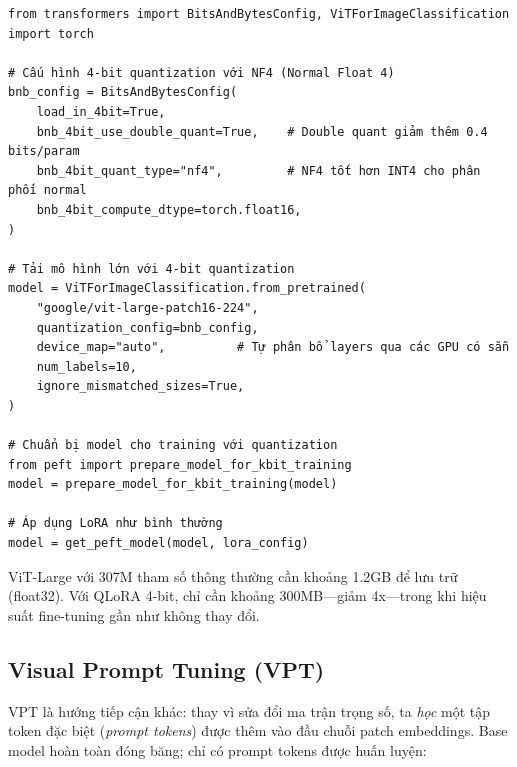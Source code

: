\begin{verbatim}
from transformers import BitsAndBytesConfig, ViTForImageClassification
import torch

# Cấu hình 4-bit quantization với NF4 (Normal Float 4)
bnb_config = BitsAndBytesConfig(
    load_in_4bit=True,
    bnb_4bit_use_double_quant=True,    # Double quant giảm thêm 0.4 bits/param
    bnb_4bit_quant_type="nf4",         # NF4 tốt hơn INT4 cho phân phối normal
    bnb_4bit_compute_dtype=torch.float16,
)

# Tải mô hình lớn với 4-bit quantization
model = ViTForImageClassification.from_pretrained(
    "google/vit-large-patch16-224",
    quantization_config=bnb_config,
    device_map="auto",          # Tự phân bổ layers qua các GPU có sẵn
    num_labels=10,
    ignore_mismatched_sizes=True,
)

# Chuẩn bị model cho training với quantization
from peft import prepare_model_for_kbit_training
model = prepare_model_for_kbit_training(model)

# Áp dụng LoRA như bình thường
model = get_peft_model(model, lora_config)
\end{verbatim}

ViT-Large với 307M tham số thông thường cần khoảng 1.2GB để lưu trữ (float32). Với QLoRA 4-bit, chỉ cần khoảng 300MB---giảm 4x---trong khi hiệu suất fine-tuning gần như không thay đổi.

\subsection*{Visual Prompt Tuning (VPT)}

VPT là hướng tiếp cận khác: thay vì sửa đổi ma trận trọng số, ta \textit{học} một tập token đặc biệt (\textit{prompt tokens}) được thêm vào đầu chuỗi patch embeddings. Base model hoàn toàn đóng băng; chỉ có prompt tokens được huấn luyện:

